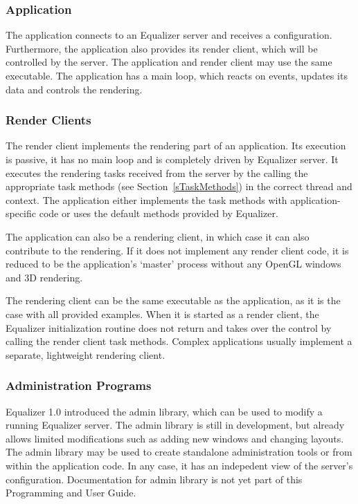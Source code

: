 \documentclass[10pt,a4]{scrartcl}
\newcommand{\sref}[1]{Section~\ref{#1}}
\begin{document}
\subsubsection{Application}

The application connects to an Equalizer server and receives a configuration.
Furthermore, the application also provides its render client, which will be
controlled by the server. The application and render client may use the same
executable. The application has a main loop, which reacts on events, updates its
data and controls the rendering.

\subsubsection{Render Clients}

The render client implements the rendering part of an application. Its execution
is passive, it has no main loop and is completely driven by Equalizer server. It
executes the rendering tasks received from the server by the calling the
appropriate task methods (see \sref{sTaskMethods}) in the correct thread and
context. The application either implements the task methods with
application-specific code or uses the default methods provided by Equalizer.

The application can also be a rendering client, in which case it can
also contribute to the rendering. If it does not implement any render
client code, it is reduced to be the application's `master' process
without any OpenGL windows and 3D rendering.

The rendering client can be the same executable as the application, as
it is the case with all provided examples. When it is started as a
render client, the Equalizer initialization routine does not return and
takes over the control by calling the render client task
methods. Complex applications usually implement a separate, lightweight
rendering client.

\subsubsection{Administration Programs}

Equalizer 1.0 introduced the admin library, which can be used to modify a
running Equalizer server. The admin library is still in development, but already
allows limited modifications such as adding new windows and changing
layouts. The admin library may be used to create standalone administration tools
or from within the application code. In any case, it has an indepedent view of
the server's configuration. Documentation for admin library is not yet part of
this Programming and User Guide.
\end{document}
